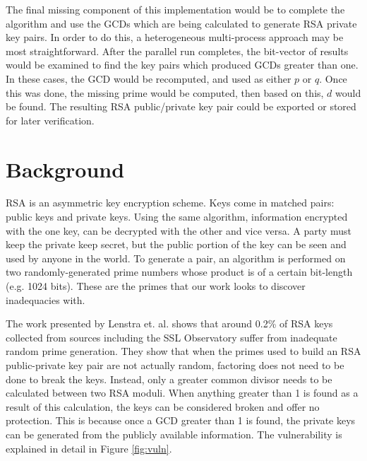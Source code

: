 \documentclass[12pt]{ucthesis}
\begin{document}
The final missing component of this implementation would be to complete the 
algorithm and use the GCDs which are being calculated to generate RSA private 
key pairs. In order to do this, a heterogeneous multi-process approach may be 
most straightforward. After the parallel run completes, the bit-vector of 
results would be examined to find the key pairs which produced GCDs greater 
than one. In these cases, the GCD would be recomputed, and used as either $p$ 
or $q$. Once this was done, the missing prime would be computed, then based on 
this, $d$ would be found. The resulting RSA public/private key pair could be 
exported or stored for later verification.


\chapter{Background}
\label{ch:background}
RSA is an asymmetric key encryption scheme. Keys come in matched pairs:
public keys and private keys. Using the same algorithm, information encrypted
with the one key, can be decrypted with the other and vice versa. A party must
keep the private keep secret, but the public portion of the key can be seen and
used by anyone in the world. To generate a pair, an algorithm is performed on
two randomly-generated prime numbers whose product is of a certain bit-length
(e.g. 1024 bits). These are the primes that our work looks to discover
inadequacies with.

The work presented by Lenstra et. al. \cite{lenstra2012ron} shows that around
0.2\% of RSA keys collected from sources including the SSL Observatory suffer
from inadequate random prime generation. They show that when the primes used to
build an RSA public-private key pair are not actually random, factoring does
not need to be done to break the keys. Instead, only a greater common divisor
needs to be calculated between two RSA moduli. When anything greater than 1 is
found as a result of this calculation, the keys can be considered broken and
offer no protection. This is because once a GCD greater than 1 is found, the
private keys can be generated from the publicly available information. The
vulnerability is explained in detail in Figure \ref{fig:vuln}.
\end{document}
